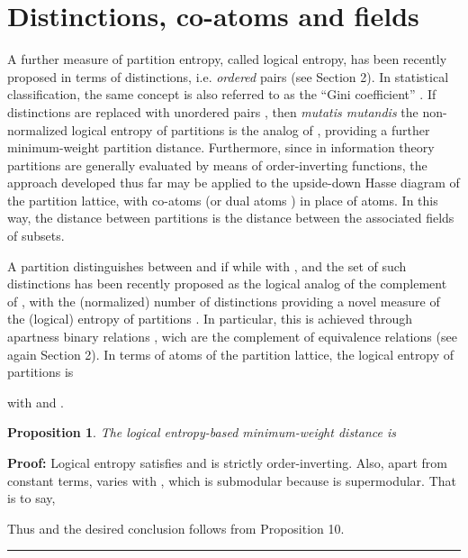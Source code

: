 \documentclass[a4paper,10pt]{article}
\newtheorem{proposition}[theorem]{Proposition}
\newenvironment{proof}[1][Proof]{\noindent\textbf{#1: }}{\ \rule{0.5em}{0.5em}}
\begin{document}
\section{Distinctions, co-atoms and fields}
A further measure of partition entropy, called logical entropy, has been recently proposed \cite{EllermanLogicalEntropy} in terms of distinctions, i.e. \textit{ordered} pairs
 (see Section 2). In statistical classification, the same concept is also referred to as the ``Gini coefficient''
\cite[pp. 53-54, 247-250, 257, 334]{Mirkin2013}. If distinctions are replaced with unordered pairs , then \textit{mutatis mutandis} the non-normalized logical
entropy of partitions  is the analog of , providing a further minimum-weight partition distance. Furthermore, since in information theory partitions are
generally evaluated by means of order-inverting functions, the approach developed thus far may be applied to the upside-down Hasse diagram of the partition lattice, with co-atoms
(or dual atoms \cite{RotaMobius}) in place of atoms. In this way, the distance between partitions is the distance between the associated fields of subsets.

A partition  distinguishes between  and  if  while  with , and the set of such distinctions has been
recently proposed as the logical analog of the complement of , with the (normalized) number of distinctions providing a novel measure of the (logical) entropy of partitions
\cite{EllermanLogicalEntropy,EllermanLogic}. In particular, this is achieved through apartness binary relations , wich are the complement of equivalence relations
 (see again Section 2). In terms of atoms  of the partition lattice, the logical entropy  of
partitions \cite[p. 127]{EllermanLogicalEntropy} is

with  and .

\begin{proposition}
The logical entropy-based minimum-weight distance  is

\end{proposition}

\begin{proof}
Logical entropy  satisfies  and is strictly order-inverting. Also, apart from constant terms,  varies with , which is submodular because  is
supermodular. That is to say,

Thus  and the desired conclusion follows from Proposition 10.
\end{proof}
\end{document}
